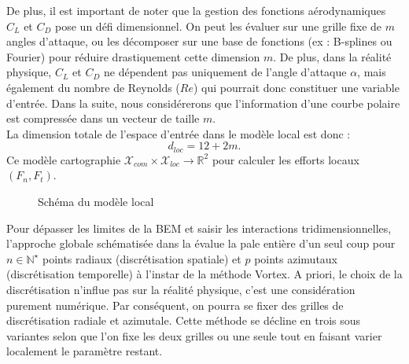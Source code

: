 \documentclass[11pt, a4paper]{article}
\begin{document}
De plus, il est important de noter que la gestion des fonctions aérodynamiques $C_L$ et $C_D$ pose un défi dimensionnel. On peut les évaluer sur une grille fixe de $m$ angles d'attaque, ou les décomposer sur une base de fonctions (ex : B-splines ou Fourier) pour réduire drastiquement cette dimension $m$.
De plus, dans la réalité physique, $C_L$ et $C_D$ ne dépendent pas uniquement de l'angle d'attaque $\alpha$, mais également du nombre de Reynolds ($Re$) qui pourrait donc constituer une variable d'entrée. Dans la suite, nous considérerons que l'information d'une courbe polaire est compressée dans un vecteur de taille $m$. \\

La dimension totale de l'espace d'entrée dans le modèle local est donc :
$$ d_{loc} = 12 + 2m. $$
Ce modèle cartographie $\mathcal{X}_{com}\times\mathcal{X}_{loc} \to \mathbb{R}^2$ pour calculer les efforts locaux $(F_n, F_t)$. \\

\begin{figure}[H]
	\centering
	\caption{Schéma du modèle local}
	\label{fig modele_local}
\end{figure}

Pour dépasser les limites de la BEM et saisir les interactions tridimensionnelles, l'approche globale schématisée dans la  évalue la pale entière d'un seul coup pour $n \in \mathbb{N}^\star$ points radiaux (discrétisation spatiale) et $p$ points azimutaux (discrétisation temporelle) à l'instar de la méthode Vortex. A priori, le choix de la discrétisation n'influe pas sur la réalité physique, c'est une considération purement numérique. Par conséquent, on pourra se fixer des grilles de discrétisation radiale et azimutale.
Cette méthode se décline en trois sous variantes selon que l'on fixe les deux grilles ou une seule tout en faisant varier localement le paramètre restant. \\
\end{document}
